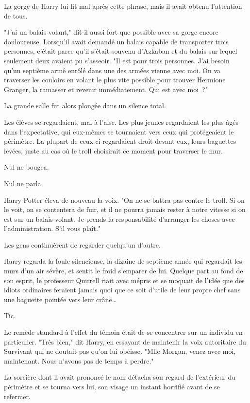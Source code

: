 La gorge de Harry lui fit mal après cette phrase, mais il avait obtenu l'attention de tous.

"J'ai un balais volant," dit-il aussi fort que possible avec sa gorge encore douloureuse. Lorsqu'il avait demandé un balais capable de transporter trois personnes, c'était parce qu'il s'était souvenu d'Azkaban et du balais sur lequel seulement deux avaient pu s'asseoir. "Il est pour trois personnes. J'ai besoin qu'un septième armé enrôlé dans une des armées vienne avec moi. On va traverser les couloirs en volant le plus vite possible pour trouver Hermione Granger, la ramasser et revenir immédiatement. Qui est avec moi~?"

La grande salle fut alors plongée dans un silence total.

Les élèves se regardaient, mal à l'aise. Les plus jeunes regardaient les plus âgés dans l'expectative, qui eux-mêmes se tournaient vers ceux qui protégeaient le périmètre. La plupart de ceux-ci regardaient droit devant eux, leurs baguettes levées, juste au cas où le troll choisirait ce moment pour traverser le mur.

Nul ne bougea.

Nul ne parla.

Harry Potter éleva de nouveau la voix. "On ne se battra pas contre le troll. Si on le voit, on se contentera de fuir, et il ne pourra jamais rester à notre vitesse si on est sur un balais volant. Je prends la responsabilité d'arranger les choses avec l'administration. S'il vous plaît."

Les gens continuèrent de regarder quelqu'un d'autre.

Harry regarda la foule silencieuse, la dizaine de septième année qui regardait les murs d'un air sévère, et sentit le froid s'emparer de lui. Quelque part au fond de son esprit, le professeur Quirrell riait avec mépris et se moquait de l'idée que des idiots ordinaires feraient jamais quoi que ce soit d'utile de leur propre chef sans une baguette pointée vers leur crâne…

Tic.

Le remède standard à l'effet du témoin était de se concentrer sur un individu en particulier. "Très bien," dit Harry, en essayant de maintenir la voix autoritaire du Survivant qui ne doutait pas qu'on lui obéisse. "Mlle Morgan, venez avec moi, maintenant. Nous n'avons pas de temps à perdre."

La sorcière dont il avait prononcé le nom détacha son regard de l'extérieur du périmètre et se tourna vers lui, son visage un instant horrifié avant de se refermer.

